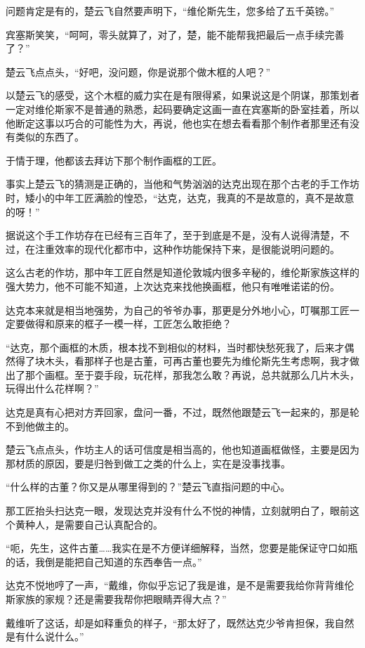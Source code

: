 问题肯定是有的，楚云飞自然要声明下，“维伦斯先生，您多给了五千英镑。”

宾塞斯笑笑，“呵呵，零头就算了，对了，楚，能不能帮我把最后一点手续完善了？”

楚云飞点点头，“好吧，没问题，你是说那个做木框的人吧？”

以楚云飞的感受，这个木框的威力实在是有限得紧，如果说这是个阴谋，那策划者一定对维伦斯家不是普通的熟悉，起码要确定这画一直在宾塞斯的卧室挂着，所以他断定这事以巧合的可能性为大，再说，他也实在想去看看那个制作者那里还有没有类似的东西了。

于情于理，他都该去拜访下那个制作画框的工匠。

事实上楚云飞的猜测是正确的，当他和气势汹汹的达克出现在那个古老的手工作坊时，矮小的中年工匠满脸的惶恐，“达克，达克，我真的不是故意的，真不是故意的呀！”

据说这个手工作坊存在已经有三百年了，至于到底是不是，没有人说得清楚，不过，在注重效率的现代化都市中，这种作坊能保持下来，是很能说明问题的。

这么古老的作坊，那中年工匠自然是知道伦敦城内很多辛秘的，维伦斯家族这样的强大势力，他不可能不知道，上次达克来找他换画框，他只有唯唯诺诺的份。

达克本来就是相当地强势，为自己的爷爷办事，那更是分外地小心，叮嘱那工匠一定要做得和原来的框子一模一样，工匠怎么敢拒绝？

“达克，那个画框的木质，根本找不到相似的材料，当时都快愁死我了，后来才偶然得了块木头，看那样子也是古董，可再古董也要先为维伦斯先生考虑啊，我才做出了那个画框。至于耍手段，玩花样，那我怎么敢？再说，总共就那么几片木头，玩得出什么花样啊？”

达克是真有心把对方弄回家，盘问一番，不过，既然他跟楚云飞一起来的，那是轮不到他做主的。

楚云飞点点头，作坊主人的话可信度是相当高的，他也知道画框做怪，主要是因为那材质的原因，要是归咎到做工之类的什么上，实在是没事找事。

“什么样的古董？你又是从哪里得到的？”楚云飞直指问题的中心。

那工匠抬头扫达克一眼，发现达克并没有什么不悦的神情，立刻就明白了，眼前这个黄种人，是需要自己认真配合的。

“呃，先生，这件古董……我实在是不方便详细解释，当然，您要是能保证守口如瓶的话，我倒是能把自己知道的东西奉告一点。”

达克不悦地哼了一声，“戴维，你似乎忘记了我是谁，是不是需要我给你背背维伦斯家族的家规？还是需要我帮你把眼睛弄得大点？”

戴维听了这话，却是如释重负的样子，“那太好了，既然达克少爷肯担保，我自然是有什么说什么。”

